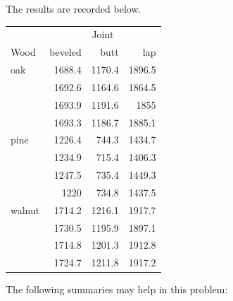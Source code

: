 \documentclass[addpoints]{examsetup}\usepackage[]{graphicx}\usepackage[]{color}
\begin{document}
\begin{questions}


The results are recorded below.

\begin{table}[h]
\centering
\begin{tabular}{lrrr}
   & \multicolumn{3}{c}{Joint} \\
\cline{2-4}
Wood & beveled & butt & lap \\ \hline \hline
oak     & 1688.4  & 1170.4  & 1896.5 \\
        & 1692.6  & 1164.6  & 1864.5 \\
        & 1693.9  & 1191.6  & 1855 \\
        & 1693.3  & 1186.7  & 1885.1 \\
pine    & 1226.4  & 744.3  & 1434.7 \\
        & 1234.9  & 715.4  & 1406.3 \\
        & 1247.5  & 735.4  & 1449.3 \\
        & 1220  & 734.8  & 1437.5 \\
walnut  & 1714.2  & 1216.1  & 1917.7 \\
        & 1730.5  & 1195.9  & 1897.1 \\
        & 1714.8  & 1201.3  & 1912.8 \\
        & 1724.7  & 1211.8  & 1917.2 \\
\hline
\end{tabular}
\end{table}

The following summaries may help in this problem:






\end{questions}
\end{document}

